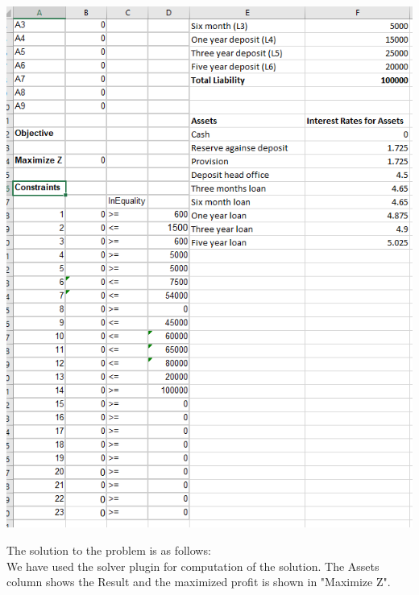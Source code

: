 				\begin{center}
				\includegraphics[width=\linewidth]{figures/LPP-Problem.jpg}	
				\label{fig: LPP Problem Formulation in Excel}
				\end{center}

The solution to the problem is as follows: \\
We have used the solver plugin for computation of the solution. The Assets column shows the Result and the maximized profit is shown in "Maximize Z".

